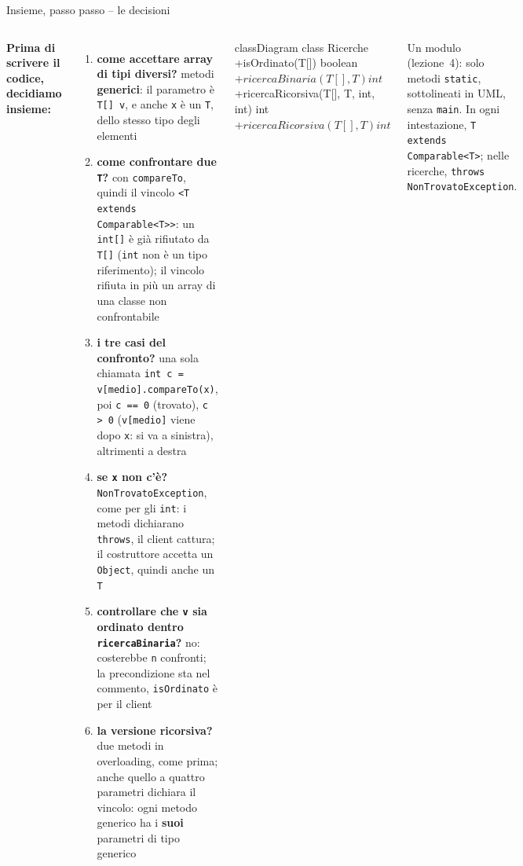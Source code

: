 \documentclass[10pt,aspectratio=169,xcolor={table}]{beamer}
\begin{document}
\begin{frame}[fragile]{Insieme, passo passo -- le decisioni}
\begin{columns}[T]
\footnotesize
\textbf{Prima di scrivere il codice, decidiamo insieme:}
\begin{enumerate}\itemsep=3pt
    \item \textbf{come accettare array di tipi diversi?} \textrightarrow{} metodi \textbf{generici}: il parametro è \texttt{T[] v}, e anche \texttt{x} è un \texttt{T}, dello stesso tipo degli elementi
    \item \textbf{come confrontare due \texttt{T}?} \textrightarrow{} con \texttt{compareTo}, quindi il vincolo \texttt{<T extends Comparable<T>>}: un \texttt{int[]} è già rifiutato da \texttt{T[]} (\texttt{int} non è un tipo riferimento); il vincolo rifiuta in più un array di una classe non confrontabile
    \item \textbf{i tre casi del confronto?} \textrightarrow{} una sola chiamata \texttt{int c = v[medio].compareTo(x)}, poi \texttt{c == 0} (trovato), \texttt{c > 0} (\texttt{v[medio]} viene dopo \texttt{x}: si va a sinistra), altrimenti a destra
    \item \textbf{se \texttt{x} non c'è?} \textrightarrow{} \texttt{NonTrovatoException}, come per gli \texttt{int}: i metodi dichiarano \texttt{throws}, il client cattura; il costruttore accetta un \texttt{Object}, quindi anche un \texttt{T}
    \item \textbf{controllare che \texttt{v} sia ordinato dentro \texttt{ricercaBinaria}?} \textrightarrow{} no: costerebbe \texttt{n} confronti; la precondizione sta nel commento, \texttt{isOrdinato} è per il client
    \item \textbf{la versione ricorsiva?} \textrightarrow{} due metodi in overloading, come prima; anche quello a quattro parametri dichiara il vincolo: ogni metodo generico ha i \textbf{suoi} parametri di tipo generico
\end{enumerate}

\begin{mermaid}
classDiagram
  class Ricerche {
    +isOrdinato(T[]) boolean$
    +ricercaBinaria(T[], T) int$
    +ricercaRicorsiva(T[], T, int, int) int$
    +ricercaRicorsiva(T[], T) int$
  }
\end{mermaid}
\footnotesize
Un modulo (lezione~4): solo metodi \texttt{static}, sottolineati in UML, senza \texttt{main}. In ogni intestazione, \texttt{T extends Comparable<T>}; nelle ricerche, \texttt{throws NonTrovatoException}.
\end{columns}
\end{frame}
\end{document}

